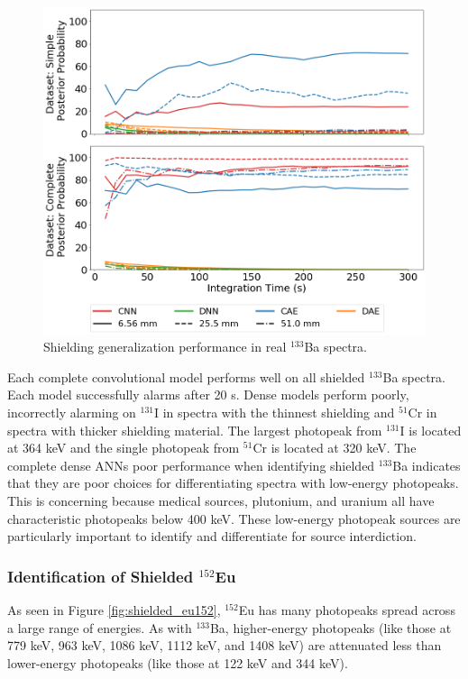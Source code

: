 \begin{figure}[H]
	\centering
	\includegraphics[width=0.8\linewidth]{images/alum_ba133}	\caption{Shielding generalization performance in real $^{133}$Ba spectra.}
	\label{fig:alum_ba133}
\end{figure}

Each complete convolutional model performs well on all shielded $^{133}$Ba spectra. Each model successfully alarms after 20 s. Dense models perform poorly, incorrectly alarming on $^{131}$I in spectra with the thinnest shielding and $^{51}$Cr in spectra with thicker shielding material. The largest photopeak from $^{131}$I is located at 364 keV and the single photopeak from $^{51}$Cr is located at 320 keV. The complete dense ANNs poor performance when identifying shielded $^{133}$Ba indicates that they are poor choices for differentiating spectra with low-energy photopeaks. This is concerning because medical sources, plutonium, and uranium all have characteristic photopeaks below 400 keV. These low-energy photopeak sources are particularly important to identify and differentiate for source interdiction.


\subsubsection{Identification of Shielded $^{152}$Eu}

As seen in Figure \ref{fig:shielded_eu152}, $^{152}$Eu has many photopeaks spread across a large range of energies. As with $^{133}$Ba, higher-energy photopeaks (like those at 779 keV, 963 keV, 1086 keV, 1112 keV, and 1408 keV) are attenuated less than lower-energy photopeaks (like those at 122 keV and 344 keV).

